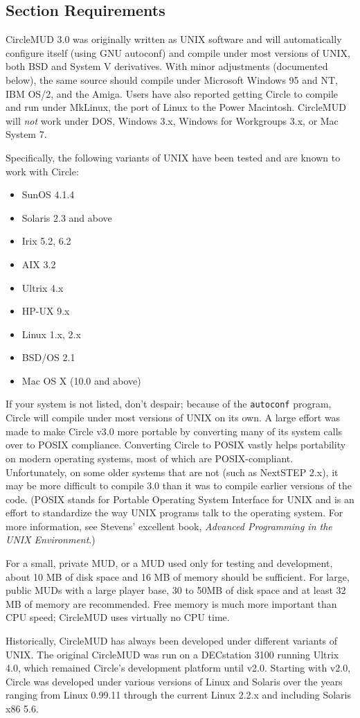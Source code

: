 \documentclass[11pt]{article}
\begin{document}
\subsection{Section Requirements}
CircleMUD 3.0 was originally written as UNIX software and will automatically configure itself (using GNU autoconf) and compile under most versions of UNIX, both BSD and System V derivatives.  With minor adjustments (documented below), the same source should compile under Microsoft Windows 95 and NT, IBM OS/2, and the Amiga.  Users have also reported getting Circle to compile and run under MkLinux, the port of Linux to the Power Macintosh.  CircleMUD will {\em not} work under DOS, Windows 3.x, Windows for Workgroups 3.x, or Mac System 7.
\par
Specifically, the following variants of UNIX have been tested and are known to work with Circle:
\begin{itemize}
\item SunOS 4.1.4
\item Solaris 2.3 and above
\item Irix 5.2, 6.2
\item AIX 3.2
\item Ultrix 4.x
\item HP-UX 9.x
\item Linux 1.x, 2.x
\item BSD/OS 2.1
\item Mac OS X (10.0 and above)
\end{itemize}
If your system is not listed, don't despair; because of the \texttt{autoconf} program, Circle will compile under most versions of UNIX on its own.  A large effort was made to make Circle v3.0 more portable by converting many of its system calls over to POSIX compliance.  Converting Circle to POSIX vastly helps portability on modern operating systems, most of which are POSIX-compliant.  Unfortunately, on some older systems that are not (such as NextSTEP 2.x), it may be more difficult to compile 3.0 than it was to compile earlier versions of the code.  (POSIX stands for Portable Operating System Interface for UNIX and is an effort to standardize the way UNIX programs talk to the operating system.  For more information, see Stevens' excellent book, {\em Advanced Programming in the UNIX Environment}.)
\par
For a small, private MUD, or a MUD used only for testing and development, about 10 MB of disk space and 16 MB of memory should be sufficient. For large, public MUDs with a large player base, 30 to 50MB of disk space and at least 32 MB of memory are recommended.  Free memory is much more important than CPU speed; CircleMUD uses virtually no CPU time.
\par
Historically, CircleMUD has always been developed under different variants of UNIX.  The original CircleMUD was run on a DECstation 3100 running Ultrix 4.0, which remained Circle's development platform until v2.0.  Starting with v2.0, Circle was developed under various versions of Linux and Solaris over the years ranging from Linux 0.99.11 through the current Linux 2.2.x and including Solaris x86 5.6.
\end{document}

